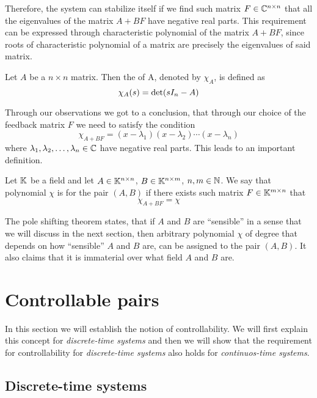 Therefore, the system can stabilize itself if we find such matrix $F \in \mathbb{C}^{n \times n}$ that all the eigenvalues of the matrix $A+BF$ have negative real parts. This requirement can be expressed through characteristic polynomial of the matrix $A+BF$, since roots of characteristic polynomial of a matrix are precisely the eigenvalues of said matrix.

\begin{definition}
	Let $A$ be a $n\times n$ matrix. Then the  of A, denoted by $\chi_A$, is defined as $$\chi_A(s)=\textnormal{det}(sI_n-A)$$
\end{definition}

Through our observations we got to a conclusion, that through our choice of the feedback matrix $F$ we need to satisfy the condition $$\chi_{A+BF}=(x-\lambda_1)(x-\lambda_2)\cdots(x-\lambda_n)$$ where $\lambda_1,\lambda_2,\ldots,\lambda_n \in \mathbb{C}$ have negative real parts. This leads to an important definition.

\begin{definition}
    Let $\mathbb{K}$ be a field and let $A \in \mathbb{K}^{n \times n}$, $B \in \mathbb{K}^{n \times m}$, $n,m \in \mathbb{N}$. We say that polynomial $\chi$ is  for the pair $(A,B)$ if there exists such matrix $F\in\mathbb{K}^{m \times n}$ that $$\chi_{A+BF}=\chi$$
\end{definition}

The pole shifting theorem states, that if $A$ and $B$ are ``sensible'' in a sense that we will discuss in the next section, then arbitrary polynomial $\chi$ of degree that depends on how ``sensible'' $A$ and $B$ are, can be assigned to the pair $(A,B)$. It also claims that it is immaterial over what field $A$ and $B$ are.

\section{Controllable pairs}

In this section we will establish the notion of controllability. We will first explain this concept for \textit{discrete-time systems} and then we will show that the requirement for controllability for \textit{discrete-time systems} also holds for \textit{continuos-time systems}.

\subsection{Discrete-time systems}


